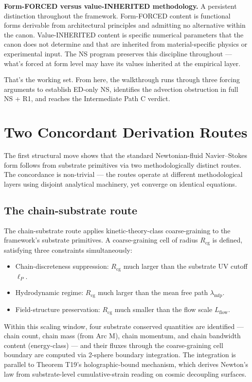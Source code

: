 \documentclass[11pt,a4paper]{article}
\begin{document}
\textbf{Form-FORCED versus value-INHERITED methodology.} A persistent distinction throughout the framework. Form-FORCED content is functional forms derivable from architectural principles and admitting no alternative within the canon. Value-INHERITED content is specific numerical parameters that the canon does not determine and that are inherited from material-specific physics or experimental input. The NS program preserves this discipline throughout --- what's forced at form level may have its values inherited at the empirical layer.

That's the working set. From here, the walkthrough runs through three forcing arguments to establish ED-only NS, identifies the advection obstruction in full NS + R1, and reaches the Intermediate Path C verdict.

\section{Two Concordant Derivation Routes}

The first structural move shows that the standard Newtonian-fluid Navier--Stokes form follows from substrate primitives via two methodologically distinct routes. The concordance is non-trivial --- the routes operate at different methodological layers using disjoint analytical machinery, yet converge on identical equations.

\subsection{The chain-substrate route}

The chain-substrate route applies kinetic-theory-class coarse-graining to the framework's substrate primitives. A coarse-graining cell of radius $R_{\mathrm{cg}}$ is defined, satisfying three constraints simultaneously:

\begin{itemize}[noitemsep]
  \item Chain-discreteness suppression: $R_{\mathrm{cg}}$ much larger than the substrate UV cutoff $\ell_P$.
  \item Hydrodynamic regime: $R_{\mathrm{cg}}$ much larger than the mean free path $\lambda_{\mathrm{mfp}}$.
  \item Field-structure preservation: $R_{\mathrm{cg}}$ much smaller than the flow scale $L_{\mathrm{flow}}$.
\end{itemize}

Within this scaling window, four substrate conserved quantities are identified --- chain count, chain mass (from Arc M), chain momentum, and chain bandwidth content (energy-class) --- and their fluxes through the coarse-graining cell boundary are computed via 2-sphere boundary integration. The integration is parallel to Theorem T19's holographic-bound mechanism, which derives Newton's law from substrate-level cumulative-strain reading on cosmic decoupling surfaces.
\end{document}

